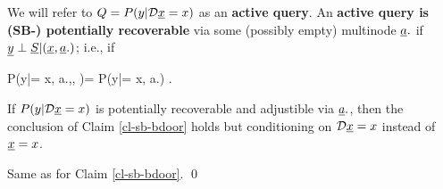 We will refer to $Q=P(y|\cald \rvx=x)$ 
as an {\bf  active query}.
An {\bf active query is
(SB-) potentially recoverable}
via some (possibly empty) multinode $\rva.$ if $\rvy\perp\rvS|(\rvx, \rva.)$; i.e., if

\beq
P(y|\cald \rvx = x, a.,\beta, )=
P(y|\cald \rvx = x, a.)
\;.
\eeq
%


\begin{claim} If $P(y|\cald \rvx=x)$ is potentially recoverable and adjustible via $\rva.$, then the conclusion of Claim \ref{cl-sb-bdoor} holds
but conditioning on $\cald\rvx=x$ instead of $\rvx=x$.
\end{claim}
\proof
Same as for Claim \ref{cl-sb-bdoor}.
\qed
                                      
